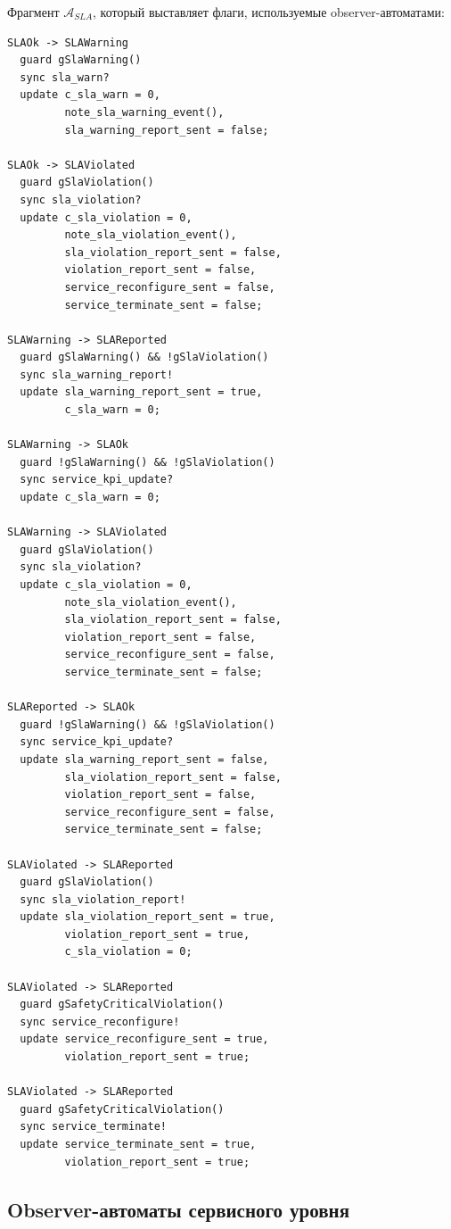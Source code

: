 \documentclass[10pt,a4paper]{article}
\newcommand{\A}[1]{\mathcal{A}_{#1}}
\begin{document}
Фрагмент \(\A{SLA}\), который выставляет флаги, используемые observer-автоматами:
\begin{verbatim}
SLAOk -> SLAWarning
  guard gSlaWarning()
  sync sla_warn?
  update c_sla_warn = 0,
         note_sla_warning_event(),
         sla_warning_report_sent = false;

SLAOk -> SLAViolated
  guard gSlaViolation()
  sync sla_violation?
  update c_sla_violation = 0,
         note_sla_violation_event(),
         sla_violation_report_sent = false,
         violation_report_sent = false,
         service_reconfigure_sent = false,
         service_terminate_sent = false;

SLAWarning -> SLAReported
  guard gSlaWarning() && !gSlaViolation()
  sync sla_warning_report!
  update sla_warning_report_sent = true,
         c_sla_warn = 0;

SLAWarning -> SLAOk
  guard !gSlaWarning() && !gSlaViolation()
  sync service_kpi_update?
  update c_sla_warn = 0;

SLAWarning -> SLAViolated
  guard gSlaViolation()
  sync sla_violation?
  update c_sla_violation = 0,
         note_sla_violation_event(),
         sla_violation_report_sent = false,
         violation_report_sent = false,
         service_reconfigure_sent = false,
         service_terminate_sent = false;

SLAReported -> SLAOk
  guard !gSlaWarning() && !gSlaViolation()
  sync service_kpi_update?
  update sla_warning_report_sent = false,
         sla_violation_report_sent = false,
         violation_report_sent = false,
         service_reconfigure_sent = false,
         service_terminate_sent = false;

SLAViolated -> SLAReported
  guard gSlaViolation()
  sync sla_violation_report!
  update sla_violation_report_sent = true,
         violation_report_sent = true,
         c_sla_violation = 0;

SLAViolated -> SLAReported
  guard gSafetyCriticalViolation()
  sync service_reconfigure!
  update service_reconfigure_sent = true,
         violation_report_sent = true;

SLAViolated -> SLAReported
  guard gSafetyCriticalViolation()
  sync service_terminate!
  update service_terminate_sent = true,
         violation_report_sent = true;
\end{verbatim}

\subsection{Observer-автоматы сервисного уровня}
\end{document}
